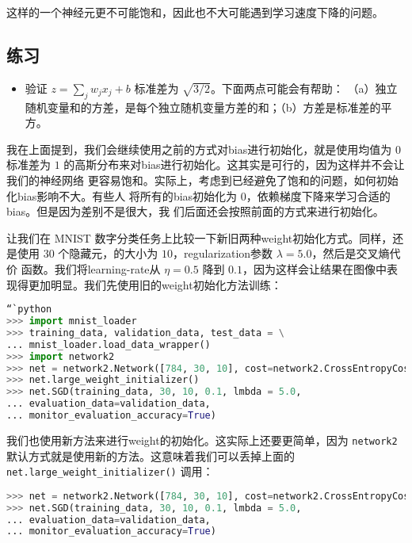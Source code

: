 这样的一个神经元更不可能饱和，因此也不大可能遇到学习速度下降的问题。

\subsection*{练习}

\begin{itemize}
\item 验证 $z = \sum_j w_j x_j + b$ 标准差为 $\sqrt{3/2}$。下面两点可能会有帮助：
  （a）独立随机变量和的方差，是每个独立随机变量方差的和；（b）方差是标准差的平方。
\end{itemize}

我在上面提到，我们会继续使用之前的方式对\gls*{bias}进行初始化，就是使用均值为 $0$ 标准差为
$1$ 的高斯分布来对\gls*{bias}进行初始化。这其实是可行的，因为这样并不会让我们的神经网络
更容易饱和。实际上，考虑到已经避免了饱和的问题，如何初始化\gls*{bias}影响不大。有些人
将所有的\gls*{bias}初始化为 $0$，依赖梯度下降来学习合适的\gls*{bias}。但是因为差别不是很大，我
们后面还会按照前面的方式来进行初始化。

让我们在 MNIST 数字分类任务上比较一下新旧两种\gls*{weight}初始化方式。同样，还是使用 $30$
个隐藏元，\minibatch 的大小为 $10$，\gls*{regularization}参数 $\lambda = 5.0$，然后是交叉熵代价
函数。我们将\gls*{learning-rate}从 $\eta=0.5$ 降到 $0.1$，因为这样会让结果在图像中表
现得更加明显。我们先使用旧的\gls*{weight}初始化方法训练：

\begin{lstlisting}[language=Python]
“`python
>>> import mnist_loader
>>> training_data, validation_data, test_data = \
... mnist_loader.load_data_wrapper()
>>> import network2
>>> net = network2.Network([784, 30, 10], cost=network2.CrossEntropyCost)
>>> net.large_weight_initializer()
>>> net.SGD(training_data, 30, 10, 0.1, lmbda = 5.0,
... evaluation_data=validation_data,
... monitor_evaluation_accuracy=True)
\end{lstlisting}

我们也使用新方法来进行\gls*{weight}的初始化。这实际上还要更简单，因为
\lstinline!network2! 默认方式就是使用新的方法。这意味着我们可以丢掉上面的
\lstinline!net.large_weight_initializer()! 调用：

\begin{lstlisting}[language=Python]
>>> net = network2.Network([784, 30, 10], cost=network2.CrossEntropyCost)
>>> net.SGD(training_data, 30, 10, 0.1, lmbda = 5.0,
... evaluation_data=validation_data,
... monitor_evaluation_accuracy=True)
\end{lstlisting}

